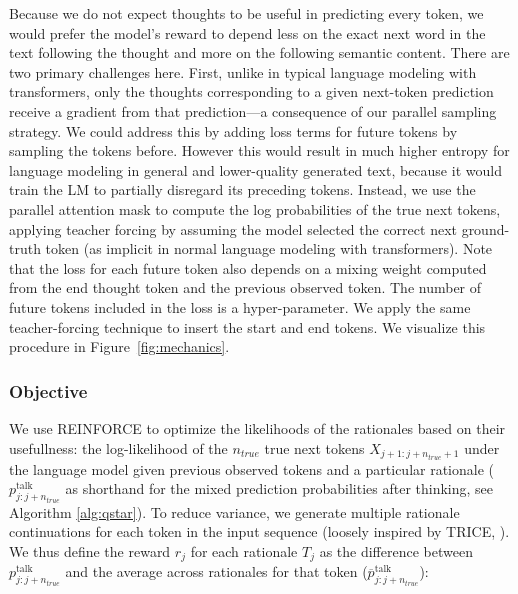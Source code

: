 \documentclass{article} %
\begin{document}
Because we do not expect thoughts to be useful in predicting every token, 
we would prefer the model's reward to depend less on the exact next word in the text following the thought and more on the following semantic content. There are two primary challenges here. First, unlike in typical language modeling with transformers, only the thoughts corresponding to a given next-token prediction receive a gradient from that prediction---a consequence of our parallel sampling strategy. 
We could address this by adding loss terms for future tokens by sampling the tokens before.
However this would result in much higher entropy for language modeling in general and lower-quality generated text,
because it would train the LM to partially disregard its preceding tokens. Instead, we use the parallel attention mask to compute the log probabilities of the true next tokens, applying teacher forcing by assuming the model selected the correct next ground-truth token (as implicit in normal language modeling with transformers).
Note that the loss for each future token also depends on a mixing weight computed from the end thought token and the previous observed token. The number of future tokens included in the loss is a hyper-parameter.
We apply the same teacher-forcing technique to insert the start and end tokens. We visualize this procedure in Figure~\ref{fig:mechanics}.

\vspace{-4px}
\subsubsection{Objective}
We use REINFORCE to optimize the likelihoods of the rationales based on their usefullness: the log-likelihood of the $n_{true}$ true next tokens $X_{j+1:j+n_{true} +1}$ under the language model given previous observed tokens and a particular rationale ($p_{j:j+n_{true}}^{\mathrm{talk}}$ as shorthand for the mixed prediction probabilities after thinking, see Algorithm \ref{alg:qstar}).
To reduce variance, we generate multiple rationale continuations for each token in the input sequence (loosely inspired by TRICE, \citet{phan2023training}). We thus define the reward $r_j$ for each rationale $T_j$ as the difference between $p_{j:j+n_{true}}^{\mathrm{talk}}$  and the average across rationales for that token ($\overline{p}_{j:j+n_{true}}^{\mathrm{talk}}$):\vspace{-9px}
\end{document}
